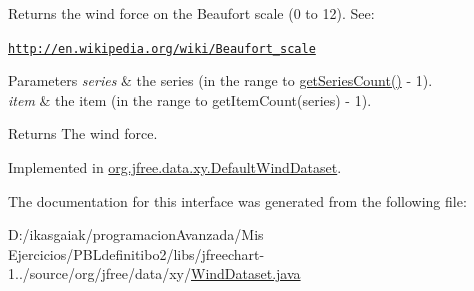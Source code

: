 Returns the wind force on the Beaufort scale (0 to 12). See\+: 

\href{http://en.wikipedia.org/wiki/Beaufort_scale}{\tt http\+://en.\+wikipedia.\+org/wiki/\+Beaufort\+\_\+scale}


\begin{DoxyParams}{Parameters}
{\em series} & the series (in the range {} to {\ttfamily \mbox{\hyperlink{interfaceorg_1_1jfree_1_1data_1_1general_1_1_series_dataset_a84fe822f5918f941d9de1ed1b73c9f58}{get\+Series\+Count()}} -\/ 1}). \\
\hline
{\em item} & the item (in the range {} to {\ttfamily get\+Item\+Count(series) -\/ 1}).\\
\hline
\end{DoxyParams}
\begin{DoxyReturn}{Returns}
The wind force. 
\end{DoxyReturn}


Implemented in \mbox{\hyperlink{classorg_1_1jfree_1_1data_1_1xy_1_1_default_wind_dataset_a39588ba40d03b43b02d85b20027eab4f}{org.\+jfree.\+data.\+xy.\+Default\+Wind\+Dataset}}.



The documentation for this interface was generated from the following file\+:\begin{DoxyCompactItemize}
\item 
D\+:/ikasgaiak/programacion\+Avanzada/\+Mis Ejercicios/\+P\+B\+Ldefinitibo2/libs/jfreechart-\/1../source/org/jfree/data/xy/\mbox{\hyperlink{_wind_dataset_8java}{Wind\+Dataset.\+java}}\end{DoxyCompactItemize}
